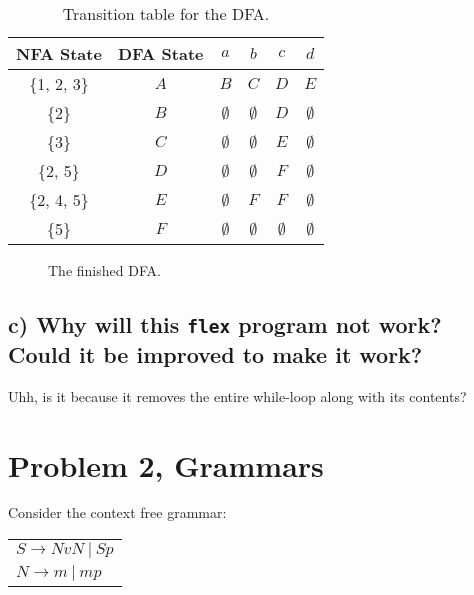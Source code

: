 \documentclass[12pt]{article}
\begin{document}
\begin{table}[H]
\begin{center}
	\begin{tabular}{|c c | c | c | c | c|}
	\hline
	NFA State & DFA State & $a$ & $b$ & $c$ & $d$ \\
	\hline \hline
	\{1, 2, 3\} & $A$ & $B$ & $C$ & $D$ & $E$ \\
	\hline 
	\{2\} & $B$ & $\emptyset$ & $\emptyset$ & $D$ & $\emptyset$ \\
	\hline 
	\{3\} & $C$ & $\emptyset$ & $\emptyset$ & $E$ & $\emptyset$ \\
	\hline 
	\{2, 5\} & $D$ & $\emptyset$ & $\emptyset$ & $F$ & $\emptyset$ \\
	\hline 
	\{2, 4, 5\} & $E$ & $\emptyset$ & $F$ & $F$ & $\emptyset$ \\
	\hline 
	\{5\} & $F$ & $\emptyset$ & $\emptyset$ & $\emptyset$ & $\emptyset$ \\
	\hline 
	\end{tabular} 
	\label{tab:1-1-b-tt}
	\caption{Transition table for the DFA.}
\end{center}
\end{table}

\begin{figure}[H]
\begin{center}
	
	\caption{The finished DFA.}
	\label{fig:1-1-b}
\end{center}
\end{figure}


\subsection{c) Why will this \texttt{flex} program not work? Could it be improved to make it work?}
Uhh, is it because it removes the entire while-loop along with its contents?

\section{Problem 2, Grammars}
Consider the context free grammar:
\begin{table}[H]
	\begin{tabular}{l}
	$S\longrightarrow NvN\:\vert \: Sp$\\
	$N\longrightarrow m\:\vert \: mp$
	\end{tabular}
\end{table}
\end{document}
